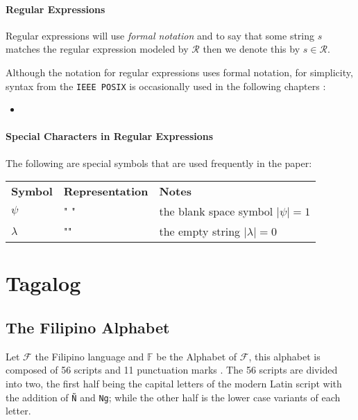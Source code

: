 \paragraph{Regular Expressions}
    Regular expressions will use \emph{formal notation} and to say that some string \(s\) matches the regular expression modeled by \(\mathcal{R}\) then we denote this by \(s \in \mathcal{R}\).

Although the notation for regular expressions uses formal notation, for simplicity, syntax from the \texttt{IEEE POSIX} is occasionally used in the following chapters \cite{posix_standard}:
\begin{itemize}
    \item 
\end{itemize}

\paragraph{Special Characters in Regular Expressions} The following are special symbols that are used frequently in the paper:

\begin{center}
    \begin{tabular}{l l l}
         \textbf{Symbol} & \textbf{Representation} & \textbf{Notes}  \\
         $\psi$          & " "                     & the blank space symbol $|\psi|=1$ \\
         $\lambda$       & ""                      & the empty string $|\lambda| = 0$
    \end{tabular}
\end{center}

\section{Tagalog}
\subsection{The Filipino Alphabet}
Let \(\mathcal{F}\) the Filipino language and \(\mathbb{F}\) be the Alphabet of \(\mathcal{F}\), this alphabet is
composed of 56 scripts and 11 punctuation marks \cite{OOP}. The 56 scripts are divided into
two, the first half being the capital letters of the modern Latin script with
the addition of \texttt{Ñ} and \texttt{Ng}; while the other half is the lower case variants
of each letter.

